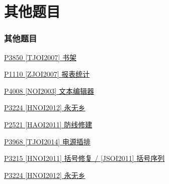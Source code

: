 \documentclass[utf8]{ctexbeamer}
\begin{document}
    \section{其他题目}

    \begin{frame}
        \frametitle{其他题目}
        \href{https://www.luogu.com.cn/problem/P3850}{\textcolor[RGB]{157,61,207}{P3850 [TJOI2007] 书架}}

        \href{https://www.luogu.com.cn/problem/P1110}{\textcolor[RGB]{52, 152, 219}{P1110 [ZJOI2007] 报表统计}}

        \href{https://www.luogu.com.cn/problem/P4008}{\textcolor[RGB]{157,61,207}{P4008 [NOI2003] 文本编辑器}}

        \href{https://www.luogu.com.cn/problem/P3224}{\textcolor[RGB]{157,61,207}{P3224 [HNOI2012] 永无乡}}
        
        \href{https://www.luogu.com.cn/problem/P2521}{\textcolor[RGB]{157,61,207}{P2521 [HAOI2011] 防线修建}}

        \href{https://www.luogu.com.cn/problem/P3968}{\textcolor[RGB]{157,61,207}{P3968 [TJOI2014] 电源插排}}
        
        \href{https://www.luogu.com.cn/problem/P3215}{\textcolor[RGB]{157,61,207}{P3215 [HNOI2011] 括号修复 / [JSOI2011] 括号序列}}

        \href{https://www.luogu.com.cn/problem/P3224}{\textcolor[RGB]{157,61,207}{P3224 [HNOI2012] 永无乡}}
        
    
    \end{frame}
\end{document}

